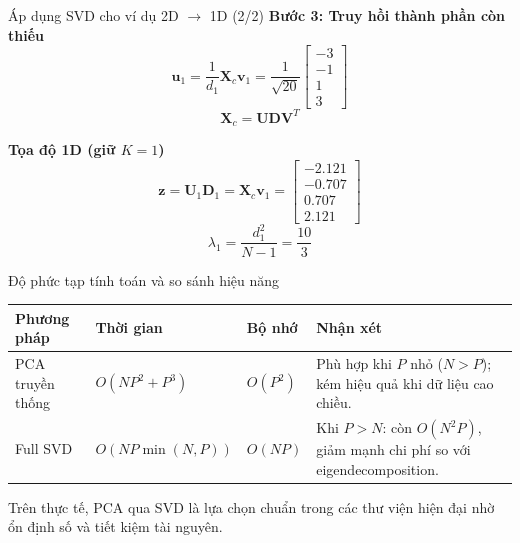 \begin{frame}{Áp dụng SVD cho ví dụ 2D $\to$ 1D (2/2)}
	\scriptsize
	\setlength{\abovedisplayskip}{0.2em}
	\setlength{\belowdisplayskip}{0.2em}
	\setlength{\abovedisplayshortskip}{0.15em}
	\setlength{\belowdisplayshortskip}{0.15em}
	\setlength{\columnsep}{0.6em}
	\textbf{Bước 3: Truy hồi thành phần còn thiếu}
	\[
		\mathbf{u}_1=\frac{1}{d_1}\mathbf{X}_c\mathbf{v}_1
		=\frac{1}{\sqrt{20}}\begin{bmatrix}-3\\-1\\1\\3\end{bmatrix}
	\]
	\[
		\mathbf{X}_c=\mathbf{U}\mathbf{D}\mathbf{V}^T
	\]

	\textbf{Tọa độ 1D (giữ $K=1$)}
	\[
		\mathbf{z}=\mathbf{U}_1\mathbf{D}_1
		=\mathbf{X}_c\mathbf{v}_1
		=\begin{bmatrix}-2.121\\-0.707\\0.707\\2.121\end{bmatrix}
	\]
	\[
		\lambda_1=\frac{d_1^2}{N-1}=\frac{10}{3}
	\]
\end{frame}

\begin{frame}{Độ phức tạp tính toán và so sánh hiệu năng}
	\footnotesize
	\renewcommand{\arraystretch}{1.35}
	\begin{tabular}{|p{2.8cm}|p{2.5cm}|p{2cm}|p{6cm}|}
		\hline
		\textbf{Phương pháp} & \textbf{Thời gian} & \textbf{Bộ nhớ} & \textbf{Nhận xét} \\
		\hline
		PCA truyền thống & $O(NP^2+P^3)$ & $O(P^2)$ & Phù hợp khi $P$ nhỏ ($N>P$); kém hiệu quả khi dữ liệu cao chiều. \\
		\hline
		Full SVD & $O(NP\min(N,P))$ & $O(NP)$ & Khi $P>N$: còn $O(N^2P)$, giảm mạnh chi phí so với eigendecomposition. \\
		\hline
	\end{tabular}

	\vspace{0.4em}
	\small
	Trên thực tế, PCA qua SVD là lựa chọn chuẩn trong các thư viện hiện đại nhờ ổn định số và tiết kiệm tài nguyên.
\end{frame}

